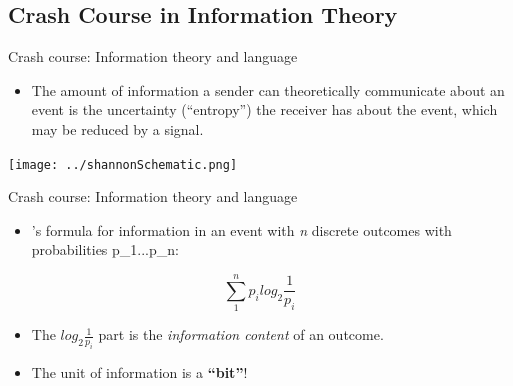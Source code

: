 \documentclass[hyperref={pdfpagelabels=false}]{beamer}
\begin{document}
\subsection{Crash Course in Information Theory}

\begin{frame}{Crash course: Information theory and language} 
\begin{itemize}
	\item The amount of information a sender can theoretically communicate about an event is the uncertainty (``entropy'') the receiver has about the event, which may be reduced by a signal.
\end{itemize}
\begin{center}

	\texttt{[image: ../shannonSchematic.png]} 


\end{center}

\end{frame}

\begin{frame}{Crash course: Information theory and language} 
	\begin{itemize}
		\item \citet{shannon1948}'s formula for information in an event with \textsl{n} discrete outcomes with probabilities p_1...p_n:
	\end{itemize}
	\begin{center}
		$$\sum_{1}^{n} p_i log_2 \frac{1}{p_i}$$
	\end{center}
	\begin{itemize}
		\item The $log_2 \frac{1}{p_i}$ part is the \textsl{information content} of an outcome.
		\item The unit of information is a \textbf{``bit''}!
	\end{itemize}
	
\end{frame}
\end{document}

